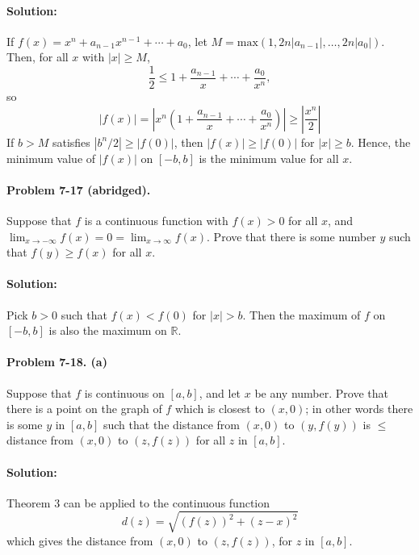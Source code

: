 \documentclass{article}
\begin{document}
\paragraph{Solution:} If $f(x) = x^n + a_{n-1}x^{n-1} + \cdots + a_0$, let $M =
\mathrm{max}(1, 2n|a_{n-1}|, \ldots, 2n|a_0|)$. Then, for all $x$ with $|x|
\geq M$, \begin{equation*}
  \frac{1}{2} \leq 1 + \frac{a_{n-1}}{x} + \cdots + \frac{a_0}{x^n},
\end{equation*} so \begin{equation*}
  |f(x)| = \left|x^n\left(1 + \frac{a_{n-1}}{x} + \cdots + \frac{a_0}{x^n}
    \right)\right| \geq \left|\frac{x^n}{2}\right|
\end{equation*}
If $b > M$ satisfies $|b^n/2| \geq |f(0)|$, then $|f(x)| \geq |f(0)|$ for $|x|
\geq b$. Hence, the minimum value of $|f(x)|$ on $[-b, b]$ is the minimum value
for all $x$.

\paragraph{Problem 7-17 (abridged).} Suppose that $f$ is a continuous function
with $f(x) > 0$ for all $x$, and $\lim_{x \rightarrow -\infty}f(x) = 0 = \lim_{
x \rightarrow \infty}f(x)$. Prove that there is some number $y$ such that $f(y)
\geq f(x)$ for all $x$.

\paragraph{Solution:} Pick $b > 0$ such that $f(x) < f(0)$ for $|x| > b$. Then
the maximum of $f$ on $[-b, b]$ is also the maximum on $\mathbb{R}$.

\paragraph{Problem 7-18. (a)} Suppose that $f$ is continuous on $[a, b]$, and
let $x$ be any number. Prove that there is a point on the graph of $f$ which
is closest to $(x, 0)$; in other words there is some $y$ in $[a, b]$ such that
the distance from $(x, 0)$ to $(y, f(y))$ is $\leq$ distance from $(x, 0)$ to
$(z, f(z))$ for all $z$ in $[a, b]$.

\paragraph{Solution:} Theorem 3 can be applied to the continuous function
\begin{equation*}
  d(z) = \sqrt{(f(z))^2 + (z - x)^2}
\end{equation*} which gives the distance from $(x, 0)$ to $(z, f(z))$, for $z$
in $[a, b]$.
\end{document}
